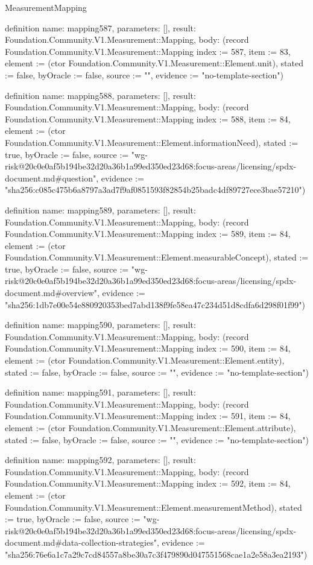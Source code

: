 \begin{lexlean}{MeasurementMapping}
\begin{semanticmodule}
definition{
  name: mapping587,
  parameters: [],
  result: Foundation.Community.V1.Measurement::Mapping,
  body: (record Foundation.Community.V1.Measurement::Mapping {index := 587, item := 83, element := (ctor Foundation.Community.V1.Measurement::Element.unit), stated := false, byOracle := false, source := "", evidence := "no-template-section"})
}

definition{
  name: mapping588,
  parameters: [],
  result: Foundation.Community.V1.Measurement::Mapping,
  body: (record Foundation.Community.V1.Measurement::Mapping {index := 588, item := 84, element := (ctor Foundation.Community.V1.Measurement::Element.informationNeed), stated := true, byOracle := false, source := "wg-risk@20c0e0af5b194be32d20a36b1a99ed350ed23d68:focus-areas/licensing/spdx-document.md#question", evidence := "sha256:c085c475b6a8797a3ad7f9af0851593f82854b25badc4df89727ece3bae57210"})
}

definition{
  name: mapping589,
  parameters: [],
  result: Foundation.Community.V1.Measurement::Mapping,
  body: (record Foundation.Community.V1.Measurement::Mapping {index := 589, item := 84, element := (ctor Foundation.Community.V1.Measurement::Element.measurableConcept), stated := true, byOracle := false, source := "wg-risk@20c0e0af5b194be32d20a36b1a99ed350ed23d68:focus-areas/licensing/spdx-document.md#overview", evidence := "sha256:1db7e00e54e880920353bed7abd138f9fe58ea47c234d51d8cdfa6d298f01f99"})
}

definition{
  name: mapping590,
  parameters: [],
  result: Foundation.Community.V1.Measurement::Mapping,
  body: (record Foundation.Community.V1.Measurement::Mapping {index := 590, item := 84, element := (ctor Foundation.Community.V1.Measurement::Element.entity), stated := false, byOracle := false, source := "", evidence := "no-template-section"})
}

definition{
  name: mapping591,
  parameters: [],
  result: Foundation.Community.V1.Measurement::Mapping,
  body: (record Foundation.Community.V1.Measurement::Mapping {index := 591, item := 84, element := (ctor Foundation.Community.V1.Measurement::Element.attribute), stated := false, byOracle := false, source := "", evidence := "no-template-section"})
}

definition{
  name: mapping592,
  parameters: [],
  result: Foundation.Community.V1.Measurement::Mapping,
  body: (record Foundation.Community.V1.Measurement::Mapping {index := 592, item := 84, element := (ctor Foundation.Community.V1.Measurement::Element.measurementMethod), stated := true, byOracle := false, source := "wg-risk@20c0e0af5b194be32d20a36b1a99ed350ed23d68:focus-areas/licensing/spdx-document.md#data-collection-strategies", evidence := "sha256:76e6a1c7a29c7cd84557a8be30a7c3f479890d047551568cae1a2e58a3ea2193"})
}


\end{semanticmodule}
\end{lexlean}
